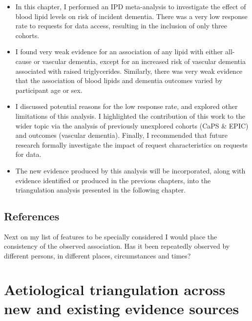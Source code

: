 \documentclass[a4paper, twoside]{templates/ociamthesis}
\begin{document}
\begin{itemize}
\item
  In this chapter, I performed an IPD meta-analysis to investigate the effect of blood lipid levels on risk of incident dementia. There was a very low response rate to requests for data access, resulting in the inclusion of only three cohorts.
\item
  I found very weak evidence for an association of any lipid with either all-cause or vascular dementia, except for an increased risk of vascular dementia associated with raised triglycerides. Similarly, there was very weak evidence that the association of blood lipids and dementia outcomes varied by participant age or sex.
\item
  I discussed potential reasons for the low response rate, and explored other limitations of this analysis. I highlighted the contribution of this work to the wider topic via the analysis of previously unexplored cohorts (CaPS \& EPIC) and outcomes (vascular dementia). Finally, I recommended that future research formally investigate the impact of request characteristics on requests for data.
\item
  The new evidence produced by this analysis will be incorporated, along with evidence identified or produced in the previous chapters, into the triangulation analysis presented in the following chapter.
\end{itemize}

\newpage

\hypertarget{references-3}{%
\section{References}\label{references-3}}

\begin{savequote}
Next on my list of features to be specially considered I would place the
consistency of the observed association. Has it been repeatedly observed
by different persons, in different places, circumstances and times?
\end{savequote}



\hypertarget{tri-heading}{%
\chapter{Aetiological triangulation across new and existing evidence sources}\label{tri-heading}}
\end{document}
